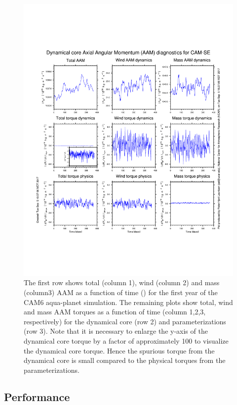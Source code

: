\documentclass{agujournal}
\begin{document}
{


\begin{figure}[h]
\centering
\includegraphics[width=30pc]{figs/aam.pdf}
\caption{The first row shows total (column 1), wind (column 2) and mass (column3) AAM as a function of time ({\color{red}{ADAM: is this daily instantaneous}}) for the first year of the CAM6 aqua-planet simulation. The remaining plots show total, wind and mass AAM torques as a function of time (column 1,2,3, respectively) for the dynamical core (row 2) and parameterizations (row 3). Note that it is necessary to enlarge the y-axis of the dynamical core torque by a factor of approximately 100 to visualize the dynamical core torque. Hence the spurious torque from the dynamical core is small compared to the physical torques from the parameterizations.}
\label{fig:aam}
\end{figure}
\subsection{Performance}\label{sec:performance}

}
\end{document}
